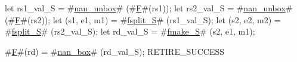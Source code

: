 let rs1_val_S    = #\hyperref[sailRISCVznanzyunbox]{nan\_unbox}# (#\hyperref[sailRISCVzF]{F}#(rs1));
let rs2_val_S    = #\hyperref[sailRISCVznanzyunbox]{nan\_unbox}# (#\hyperref[sailRISCVzF]{F}#(rs2));
let (s1, e1, m1) = #\hyperref[sailRISCVzfsplitzyS]{fsplit\_S}# (rs1_val_S);
let (s2, e2, m2) = #\hyperref[sailRISCVzfsplitzyS]{fsplit\_S}# (rs2_val_S);
let rd_val_S     = #\hyperref[sailRISCVzfmakezyS]{fmake\_S}# (s2, e1, m1);

#\hyperref[sailRISCVzF]{F}#(rd) = #\hyperref[sailRISCVznanzybox]{nan\_box}# (rd_val_S);
RETIRE_SUCCESS
